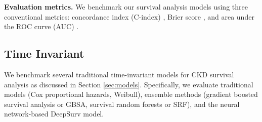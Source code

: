 \textbf{Evaluation metrics.} We benchmark our survival analysis models using three conventional metrics: concordance index (C-index) \citep{longato2020practical_c_index}, Brier score \citep{assel2017brier}, and area under the ROC curve (AUC) \citep{huang2005using_AUC}.

\subsection{Time Invariant}
We benchmark several traditional time-invariant models for CKD survival analysis as discussed in Section \ref{sec:models}. Specifically, we evaluate traditional models (Cox proportional hazards, Weibull), ensemble methods (gradient boosted survival analysis or GBSA, survival random forests or SRF), and the neural network-based DeepSurv model.

